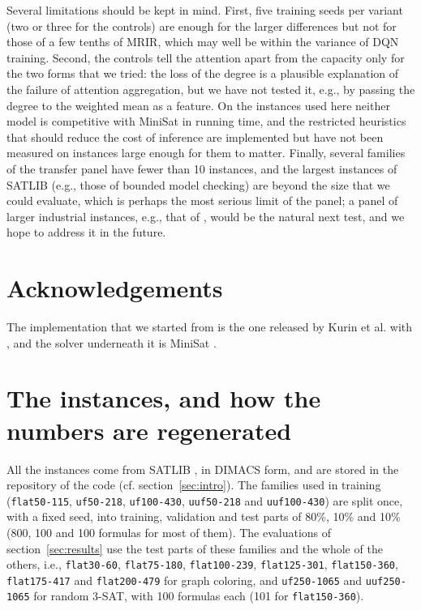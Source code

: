 \documentclass[11pt,a4paper]{article}
\newcommand{\code}[1]{\texttt{\def\_{\textunderscore\allowbreak}#1}}
\begin{document}
\smallskip
\noindent
Several limitations should be kept in mind. First, five training seeds per
variant (two or three for the controls) are enough for the larger differences
but not for those of a few tenths of MRIR, which may well be within the
variance of DQN training. Second, the controls tell the attention apart from the
capacity only for the two forms that we tried: the loss of the degree is a
plausible explanation of the failure of attention aggregation, but we have not
tested it, e.g., by passing the degree to the weighted mean as a feature. On the instances used here neither model is competitive with MiniSat
in running time, and the restricted heuristics that should reduce the cost of
inference are implemented but have not been measured on instances large enough
for them to matter. Finally, several families of the transfer panel have fewer
than 10 instances, and the largest instances of SATLIB (e.g., those of bounded
model checking) are beyond the size that we could evaluate, which is perhaps
the most serious limit of the panel; a panel of larger
industrial instances, e.g., that of \cite{Li2024}, would be the natural next
test, and we hope to address it in the future.

\section*{Acknowledgements}\label{sec:ack}

The implementation that we started from is the one released by Kurin et al.
with \cite{Kurin2020}, and the solver underneath it is MiniSat
\cite{EenSorensson2003}.




\appendix
\section{The instances, and how the numbers are regenerated}\label{app:instances}

All the instances come from SATLIB \cite{HoosStutzle2000}, in DIMACS form, and
are stored in the repository of the code (cf. section~\ref{sec:intro}). The families used in training
(\code{flat50-115}, \code{uf50-218}, \code{uf100-430}, \code{uuf50-218} and
\code{uuf100-430}) are split once, with a fixed seed, into training, validation
and test parts of 80\%, 10\% and 10\% (800, 100 and 100 formulas for most of
them). The evaluations of section~\ref{sec:results} use the test parts of these
families and the whole of the others, i.e., \code{flat30-60},
\code{flat75-180}, \code{flat100-239}, \code{flat125-301}, \code{flat150-360},
\code{flat175-417} and \code{flat200-479} for graph coloring, and
\code{uf250-1065} and \code{uuf250-1065} for random 3-SAT, with 100 formulas
each (101 for \code{flat150-360}).
\end{document}
